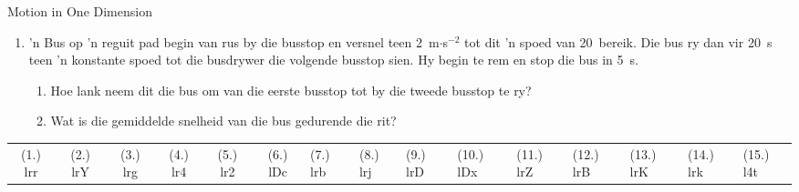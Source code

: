 \begin{eocexercises}{Motion in One Dimension}
\begin{enumerate}[noitemsep, label=\textbf{\arabic*}. ]
    \item  'n Bus op  'n reguit pad begin van rus by die busstop en versnel teen 2~m$\cdot$s$^{-2}$ tot dit  'n spoed van 20~\ms bereik. Die bus ry dan vir 20~s teen  'n konstante spoed tot die busdrywer die volgende busstop sien. Hy begin te rem en stop die bus in 5~s.
    \begin{enumerate}
    \item Hoe lank neem dit die bus om van die eerste busstop tot by die tweede busstop te ry?
    \item Wat is die gemiddelde snelheid van die bus gedurende die rit?
    \end{enumerate}
    \end{enumerate}
\practiceinfo
     \par \begin{tabular}[h]{cccccc}
     (1.) lrr  &  (2.) lrY  &  (3.) lrg  &  (4.) lr4  &  (5.) lr2  &  (6.) lDc  & (7.) lrb & (8.) lrj & (9.) lrD & (10.) lDx &
    (11.) lrZ & (12.) lrB & (13.) lrK & (14.) lrk & (15.) l4t
     \end{tabular}
\end{eocexercises}
